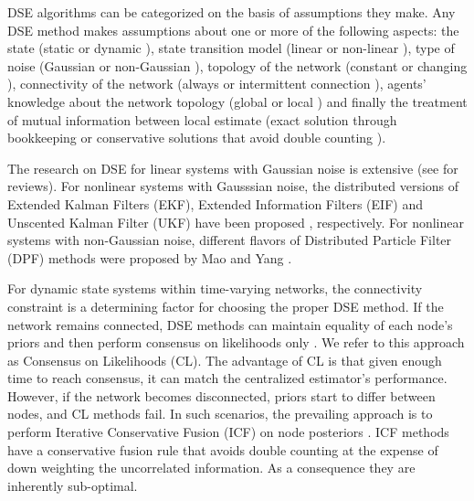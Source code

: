\documentclass[conference]{IEEEtran}
\theoremstyle{remark}
\begin{document}
DSE algorithms can be categorized on the basis of assumptions they make. Any
DSE method makes assumptions about one or more of the following aspects: the
state (static \cite{xiao2005scheme} or dynamic \cite{5509143}), state
transition model (linear \cite{olfati2005distributed} or non-linear
\cite{battistelli2014parallel,rao2003constrained,boem2013distributed,hu2014state}),
type of noise (Gaussian \cite{xiao2005scheme,olfati2005distributed} or
non-Gaussian \cite{hlinka2013distributed}), topology of the network (constant
or changing \cite{tamjidi2016unifying,xiao2005scheme}), connectivity of the
network (always \cite{battistelli2014parallel} or intermittent connection
\cite{tamjidi2016unifying,xiao2005scheme}), agents' knowledge about the network
topology (global or local
\cite{tamjidi2016unifying,xiao2005scheme,battistelli2014parallel}) and finally
the treatment of  mutual information between local estimate (exact solution
through bookkeeping \cite{durrant2001data} or conservative  solutions that
avoid double counting \cite{wang_distr_CI,hu2012diffusion}).

The research on DSE for linear systems with Gaussian noise is extensive (see 
\cite{olfati2005distributed,cattivelli2010diffusion} for reviews). For 
nonlinear systems with Gausssian noise, the distributed versions of Extended 
Kalman Filters (EKF), Extended Information Filters (EIF) and Unscented Kalman 
Filter (UKF) have been proposed  
\cite{battistelli2016stability,dist_inf_filter_2009,battistelli2014parallel}, 
respectively. For nonlinear systems with non-Gaussian noise, different flavors 
of Distributed Particle Filter (DPF) methods were proposed by Mao and Yang
\cite{lin_dist_part_filter_2014}. 

For dynamic state systems within time-varying networks, the connectivity constraint is a determining factor for 
choosing the proper DSE method. If the network remains connected, DSE methods 
can maintain equality of each node's priors and then perform consensus on likelihoods only 
\cite{hlinka2012likelihood,li2012distributed}. We refer to this approach as 
Consensus on Likelihoods (CL). The advantage of CL is that given enough time to 
reach consensus, it can match the centralized estimator's performance. However, 
if the network becomes disconnected, priors start to differ between nodes, and CL methods 
fail. In such scenarios, the prevailing  approach is to perform Iterative 
Conservative Fusion (ICF) on node posteriors 
\cite{battistelli2014kullback,wang_distr_CI,hu2012diffusion}. ICF methods have a conservative fusion rule that 
avoids double counting at the expense of down weighting the uncorrelated 
information. As a consequence they are inherently sub-optimal.
\end{document}
